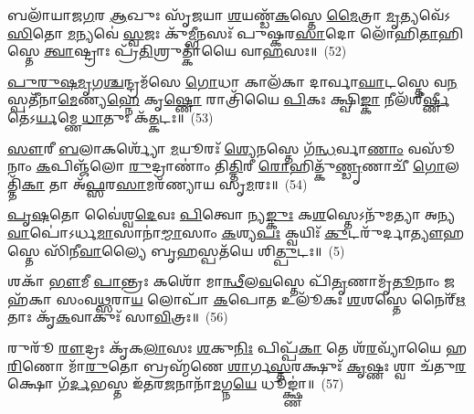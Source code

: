 {\anuvakamend[{\-\ul{𑌅}\-𑌪𑌾𑌮𑍇\-\ul{𑌕𑌾}\-𑌨𑍍𑌨𑌵𑌿𑍞᳴𑌶𑌤𑌿𑌃}]}%

𑌬𑌲𑌾᳴𑌯𑌾𑌜\-\ul{𑌗}\-𑌰 \ul{𑌆}\-𑌖𑍁𑌃 𑌸𑍃᳴\-\ul{𑌜}\-𑌯𑌾 \ul{𑌶}\-𑌯𑌣𑍍𑌡᳴\-\ul{𑌕}\-𑌸𑍍𑌤𑍇 \ul{𑌮𑍈}\-𑌤𑍍𑌰𑌾 \ul{𑌮𑍃}\-𑌤𑍍𑌯𑌵𑍇᳴\-𑌽\-\ul{𑌸𑌿}\-𑌤𑍋 \ul{𑌮}\-𑌨𑍍𑌯𑌵𑍇॑ \ul{𑌸𑍍𑌵}\-𑌜𑌃 𑌕𑍁᳴\-\ul{𑌮𑍍𑌭𑍀}\-𑌨𑌸𑌃᳴ 𑌪𑍁𑌷𑍍𑌕𑌰\-\ul{𑌸𑌾}\-𑌦𑍋 𑌲𑍋᳴𑌹𑌿\-\ul{𑌤𑌾}\-𑌹𑌿𑌸𑍍𑌤𑍇 \ul{𑌤𑍍𑌵𑌾}\-𑌷𑍍𑌟𑍍𑌰𑌾𑌃 𑌪𑍍𑌰᳴\-\ul{𑌤𑌿}\-𑌶𑍍𑌰𑍁𑌤𑍍𑌕𑌾᳴𑌯𑍈 𑌵𑌾\-\ul{𑌹}\-𑌸𑌃॥~(52)

{\anuvakamend[{}]}

\-\ul{𑌪𑍁}\-\-\ul{𑌰𑍁}\-\-\ul{𑌷}\-\-\ul{𑌮𑍃}\-𑌗\-\ul{𑌶𑍍𑌚}\-𑌨𑍍𑌦𑍍𑌰𑌮᳴𑌸𑍇 \ul{𑌗𑍋}\-𑌧𑌾 𑌕𑌾𑌲᳴𑌕𑌾 𑌦𑌾𑌰𑍍𑌵𑌾\-\ul{𑌘𑌾}\-𑌟𑌸𑍍𑌤𑍇 𑌵\-\ul{𑌨}\-𑌸𑍍𑌪𑌤𑍀᳴𑌨𑌾\-\ul{𑌮𑍇}\-𑌣𑍍𑌯\-\ul{𑌹𑍍𑌨𑍇} 𑌕𑍃\-\ul{𑌷𑍍𑌣𑍋} 𑌰𑌾𑌤𑍍𑌰𑌿᳴𑌯𑍈 \ul{𑌪𑌿}\-𑌕𑌃 𑌕𑍍𑌷𑍍𑌵𑌿\-\ul{𑌙𑍍𑌕𑌾} 𑌨𑍀𑌲᳴𑌶𑍀\-\ul{𑌰𑍍𑌷𑍍𑌣𑍀} 𑌤𑍇॑\-𑌽\-\ul{𑌰𑍍𑌯}\-𑌮𑍍𑌣𑍇 \ul{𑌧𑌾}\-𑌤𑍁𑌃 𑌕᳴\-\ul{𑌤𑍍𑌕}\-𑌟𑌃॥~(53)

{\anuvakamend[{}]}

\-\ul{𑌸𑍗}\-𑌰𑍀 \ul{𑌬}\-𑌲𑌾𑌕𑌰𑍍𑌶𑍍𑌯𑍋᳴ \ul{𑌮}\-𑌯𑍂𑌰𑌃᳴ \ul{𑌶𑍍𑌯𑍇}\-𑌨𑌸𑍍𑌤𑍇 𑌗᳴\-\ul{𑌨𑍍𑌧}\-𑌰𑍍𑌵𑌾\-\ul{𑌣𑌾𑌂} 𑌵𑌸𑍂᳴𑌨𑌾𑌂 \ul{𑌕}\-𑌪𑌿𑌞𑍍𑌜᳴𑌲𑍋 \ul{𑌰𑍁}\-𑌦𑍍𑌰𑌾𑌣𑌾𑌂॑ 𑌤𑌿\-\ul{𑌤𑍍𑌤𑌿}\-𑌰𑍀 \ul{𑌰𑍋}\-𑌹𑌿𑌤𑍍𑌕𑍁᳴\-\ul{𑌣𑍍𑌡𑍃}\-𑌣𑌾𑌚𑍀᳴ \ul{𑌗𑍋}\-𑌲𑌤𑍍𑌤𑌿᳴\-\ul{𑌕𑌾} 𑌤𑌾 𑌅᳴\-\ul{𑌫𑍍𑌸}\-𑌰\-\ul{𑌸𑌾}\-𑌮𑌰᳴𑌣𑍍𑌯𑌾𑌯 𑌸𑍃\-\ul{𑌮}\-𑌰𑌃॥~(54)

{\anuvakamend[{}]}

\-\ul{𑌪𑍃}\-\-\ul{𑌷}\-𑌤𑍋 𑌵𑍈॑𑌶𑍍𑌵\-\ul{𑌦𑍇}\-𑌵𑌃 \ul{𑌪𑌿}\-𑌤𑍍𑌵𑍋 𑌨𑍍𑌯\-\ul{𑌙𑍍𑌕𑍁𑌃} 𑌕\-\ul{𑌶}\-𑌸𑍍𑌤𑍇\-𑌽𑌨𑍁᳴𑌮𑌤𑍍𑌯𑌾 𑌅𑌨𑍍𑌯\-\ul{𑌵𑌾}\-𑌪𑍋॑\-𑌽𑌰𑍍𑌧\-\ul{𑌮𑌾}\-𑌸𑌾𑌨𑌾॑\-\ul{𑌮𑍍𑌮𑌾}\-𑌸𑌾𑌂 \ul{𑌕}\-𑌶𑍍𑌯\-\ul{𑌪𑌃} 𑌕𑍍𑌵𑌯𑌿𑌃᳴ \ul{𑌕𑍁}\-𑌟𑌰𑍁᳴𑌰𑍍𑌦𑌾\-\ul{𑌤𑍍𑌯𑍗}\-𑌹𑌸𑍍𑌤𑍇 𑌸𑌿᳴𑌨𑍀\-\ul{𑌵𑌾}\-𑌲𑍍𑌯𑍈 𑌬𑍃\-\ul{𑌹}\-𑌸𑍍𑌪𑌤᳴𑌯𑍇 𑌶𑌿\-\ul{𑌤𑍍𑌪𑍁}\-𑌟𑌃॥~(5)

{\anuvakamend[{}]}

𑌶𑌕𑌾᳴ \ul{𑌭𑍗}\-𑌮𑍀 \ul{𑌪𑌾}\-𑌨𑍍𑌤𑍍𑌰𑌃 𑌕𑌶𑍋᳴ 𑌮𑌾\-\ul{𑌨𑍍𑌥𑍀}\-𑌲\-\ul{𑌵}\-𑌸𑍍𑌤𑍇 𑌪𑌿᳴\-\ul{𑌤𑍃}\-𑌣𑌾𑌮𑍃᳴\-\ul{𑌤𑍂}\-𑌨𑌾𑌂 𑌜𑌹᳴𑌕𑌾 𑌸𑌂𑌵\-\ul{𑌥𑍍𑌸}\-𑌰𑌾\-\ul{𑌯} 𑌲𑍋𑌪𑌾᳴ \ul{𑌕}\-𑌪𑍋\-\ul{𑌤} 𑌉𑌲𑍂᳴𑌕𑌃 \ul{𑌶}\-𑌶𑌸𑍍𑌤𑍇 𑌨𑍈𑌰𑍍\mbox{}᳴\-\ul{𑌋}\-𑌤𑌾𑌃 𑌕𑍃᳴\-\ul{𑌕}\-𑌵𑌾𑌕𑍁𑌃᳴ 𑌸𑌾\-\ul{𑌵𑌿}\-𑌤𑍍𑌰𑌃॥~(56)

{\anuvakamend[{𑌬𑌲𑌾᳴𑌯 𑌪𑍁𑌰𑍁𑌷\-\ul{𑌮𑍃}\-𑌗𑌃 \ul{𑌸𑍗}\-𑌰𑍀 𑌪𑍃᳴\-\ul{𑌷}\-𑌤𑌃 𑌶\-\ul{𑌕𑌾}\-𑌷𑍍𑌟𑌾𑌦᳴\-\ul{𑌶𑌾}\-𑌷𑍍𑌟𑌾𑌦᳴𑌶}]}%

𑌰𑍁𑌰𑍂᳴ \ul{𑌰𑍗}\-𑌦𑍍𑌰𑌃 𑌕𑍃᳴𑌕\-\ul{𑌲𑌾}\-𑌸𑌃 \ul{𑌶}\-𑌕𑍁\-\ul{𑌨𑌿𑌃} 𑌪𑌿𑌪𑍍𑌪᳴\-\ul{𑌕𑌾} 𑌤𑍇 𑌶᳴\-\ul{𑌰}\-𑌵𑍍𑌯𑌾᳴𑌯𑍈 𑌹\-\ul{𑌰𑌿}\-𑌣𑍋 𑌮𑌾᳴\-\ul{𑌰𑍁}\-𑌤𑍋 𑌬𑍍𑌰𑌹𑍍𑌮᳴𑌣𑍇 \ul{𑌶𑌾}\-𑌰𑍍𑌗\-\ul{𑌸𑍍𑌤}\-𑌰𑌕𑍍𑌷𑍁𑌃᳴ \ul{𑌕𑍃}\-𑌷𑍍𑌣𑌃 𑌶𑍍𑌵𑌾 𑌚᳴𑌤𑍁\-\ul{𑌰}\-𑌕𑍍𑌷𑍋 𑌗᳴\-\ul{𑌰𑍍𑌦}\-𑌭𑌸𑍍𑌤 𑌇᳴𑌤𑌰\-\ul{𑌜}\-𑌨𑌾𑌨𑌾᳴\-\ul{𑌮}\-𑌗𑍍𑌨\-\ul{𑌯𑍇} 𑌧𑍂𑌙𑍍𑌕𑍍𑌷𑍍𑌣𑌾॑॥~(57)

{\anuvakamend[{𑌰𑍁𑌰𑍁᳴𑌰𑍍𑌵𑌿𑍞\-\ul{𑌶}\-𑌤𑌿𑌃}]}%


